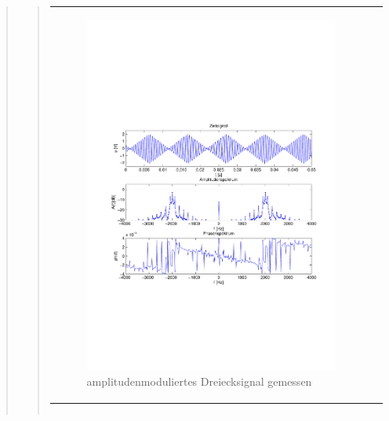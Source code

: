 \begin{quote}
\begin{quote}
\begin{center}
\begin{tabular}{ll}
\begin{minipage}{0.6\textwidth}
                     \begin{figure}[H]
                        \label{fig:}
                        \includegraphics[scale=0.5, trim = 2cm 6.5cm 1.5cm
                        8.5cm, clip]{./Bilder/Dreieckmodgemessen} %
                        \caption{amplitudenmoduliertes Dreiecksignal gemessen}
                    \end{figure}
               \vspace{-1.5em}

                \end{minipage}

            \end{tabular}
            \end{center}
            
                    \begin{center}
            \begin{tabular}{ll}


\end{tabular}
\end{center}
\end{quote}
\end{quote}
